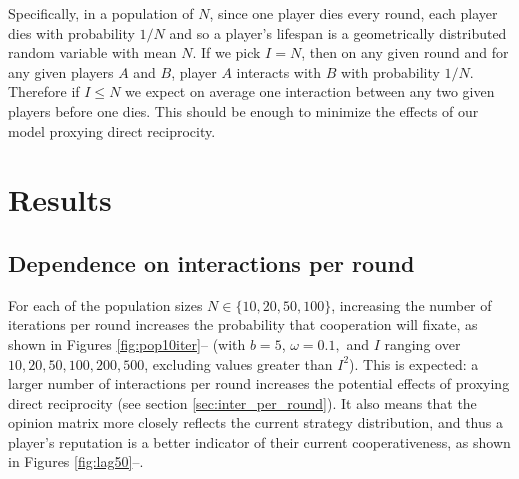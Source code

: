 \documentclass{amsart}
\newcommand{\om}{\omega}
\begin{document}
Specifically, in a population of $N$, since one player dies every
round, each player dies with probability $1/N$ and so a player's
lifespan is a geometrically distributed random variable with mean
$N$. If we pick $I=N$, then on any given round and for any given
players $A$ and $B$, player $A$ interacts with $B$ with probability
$1/N$. Therefore if $I\le N$ we expect on average one interaction
between any two given players before one dies. This should be enough
to minimize the effects of our model proxying direct reciprocity.

\section{Results}
\label{sec:results}

\subsection{Dependence on interactions per round}

For each of the population sizes $N \in \{10,20,50,100\}$, increasing
the number of iterations per round increases the probability that
cooperation will fixate, as shown in Figures
\ref{fig:pop10iter}-- (with $b=5$, $\om=0.1,$
and $I$ ranging over $10,20,50,100,200,500$, excluding values greater
than $I^2$). This is expected: a larger number of interactions per
round increases the potential effects of proxying direct reciprocity
(see section \ref{sec:inter_per_round}). It also means that the
opinion matrix more closely reflects the current strategy
distribution, and thus a player's reputation is a better indicator of
their current cooperativeness, as shown in Figures
\ref{fig:lag50}--.
\end{document}
